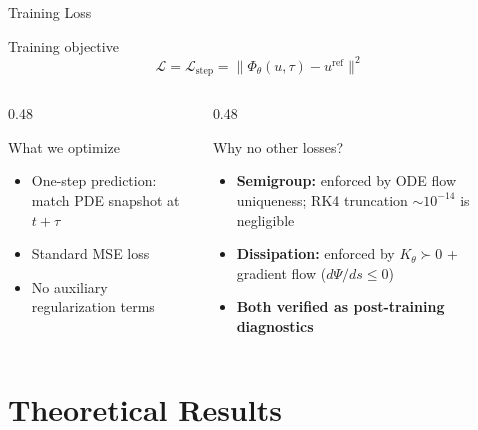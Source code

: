 \documentclass[aspectratio=169, 11pt]{beamer}
\begin{document}
\begin{frame}{Training Loss}

\centering
\begin{block}{Training objective}
\[
\mathcal{L} = \mathcal{L}_{\mathrm{step}} = \|\Phi_\theta(u,\tau) - u^{\mathrm{ref}}\|^2
\]
\end{block}

\vspace{0.5cm}
\begin{columns}[T]
\begin{column}{0.48\textwidth}
\begin{exampleblock}{What we optimize}
\begin{itemize}
    \item One-step prediction: match PDE snapshot at $t+\tau$
    \item Standard MSE loss
    \item No auxiliary regularization terms
\end{itemize}
\end{exampleblock}
\end{column}

\begin{column}{0.48\textwidth}
\begin{exampleblock}{Why no other losses?}
\begin{itemize}
    \item \textbf{Semigroup:} enforced by ODE flow uniqueness; RK4 truncation $\sim 10^{-14}$ is negligible
    \item \textbf{Dissipation:} enforced by $K_\theta \succ 0$ + gradient flow ($d\Psi/ds \leq 0$)
    \item \textbf{Both verified as post-training diagnostics}
\end{itemize}
\end{exampleblock}
\end{column}
\end{columns}
\end{frame}

\section{Theoretical Results}
\end{document}
